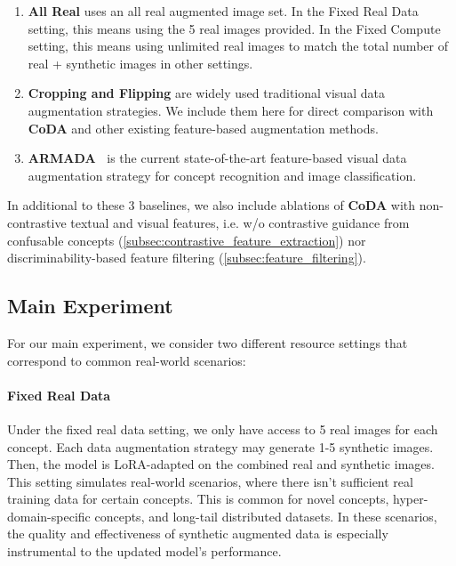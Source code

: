\begin{enumerate}[topsep=0pt, itemsep=0em]
    \item \textbf{All Real} uses an all real augmented image set. In the Fixed Real Data setting, this means using the 5 real images provided. In the Fixed Compute setting, this means using unlimited real images to match the total number of real + synthetic images in other settings.
    
    
    \item \textbf{Cropping and Flipping} are widely used traditional visual data augmentation strategies. We include them here for direct comparison with \textbf{CoDA} and other existing feature-based augmentation methods.
    
    \item \textbf{ARMADA~\cite{jin2024armada}} is the current state-of-the-art feature-based visual data augmentation strategy for concept recognition and image classification. 
\end{enumerate}

In additional to these 3 baselines, we also include ablations of \textbf{CoDA} with non-contrastive textual and visual features, i.e. w/o contrastive guidance from confusable concepts (\ref{subsec:contrastive_feature_extraction}) nor discriminability-based feature filtering (\ref{subsec:feature_filtering}).


\subsection{Main Experiment}
\label{subsec:main_experiment}

For our main experiment, we consider two different resource settings that correspond to common real-world scenarios: 

\vspace{-0.5em}
\paragraph*{Fixed Real Data} Under the fixed real data setting, we only have access to 5 real images for each concept. Each data augmentation strategy may generate 1-5 synthetic images. Then, the model is LoRA-adapted on the combined real and synthetic images. This setting simulates real-world scenarios, where there isn't sufficient real training data for certain concepts. This is common for novel concepts, hyper-domain-specific concepts, and long-tail distributed datasets. In these scenarios, the quality and effectiveness of synthetic augmented data is especially instrumental to the updated model's performance. 

